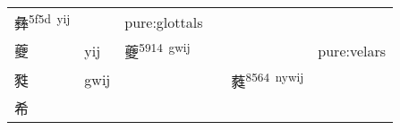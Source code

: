 \documentclass[14pt,a4paper]{scrartcl}
\begin{document}
\begin{longtable}[c]{@{}llllll@{}}
\begin{minipage}[t]{0.14\columnwidth}
彝\textsuperscript{5f5d~yij}
\strut\end{minipage} &
\begin{minipage}[t]{0.14\columnwidth}\raggedright\strut
\strut\end{minipage} &
\begin{minipage}[t]{0.14\columnwidth}\raggedright\strut
pure:glottals
\strut\end{minipage}\tabularnewline
\begin{minipage}[t]{0.14\columnwidth}\raggedright\strut
夔
\strut\end{minipage} &
\begin{minipage}[t]{0.14\columnwidth}\raggedright\strut
yij
\strut\end{minipage} &
\begin{minipage}[t]{0.14\columnwidth}\raggedright\strut
夔\textsuperscript{5914~gwij}
\strut\end{minipage} &
\begin{minipage}[t]{0.14\columnwidth}\raggedright\strut
\strut\end{minipage} &
\begin{minipage}[t]{0.14\columnwidth}\raggedright\strut
\strut\end{minipage} &
\begin{minipage}[t]{0.14\columnwidth}\raggedright\strut
pure:velars
\strut\end{minipage}\tabularnewline
\begin{minipage}[t]{0.14\columnwidth}\raggedright\strut
甤
\strut\end{minipage} &
\begin{minipage}[t]{0.14\columnwidth}\raggedright\strut
gwij
\strut\end{minipage} &
\begin{minipage}[t]{0.14\columnwidth}\raggedright\strut
\strut\end{minipage} &
\begin{minipage}[t]{0.14\columnwidth}\raggedright\strut
\strut\end{minipage} &
\begin{minipage}[t]{0.14\columnwidth}\raggedright\strut
蕤\textsuperscript{8564~nywij}
\strut\end{minipage} &
\begin{minipage}[t]{0.14\columnwidth}\raggedright\strut
\strut\end{minipage}\tabularnewline
\begin{minipage}[t]{0.14\columnwidth}\raggedright\strut
希
\strut\end{minipage} &

\end{longtable}
\end{document}
